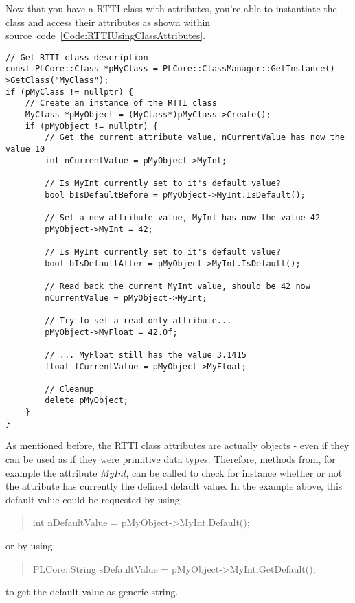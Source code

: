 Now that you have a \ac{RTTI} class with attributes, you're able to instantiate the class and access their attributes as shown within source~code~\ref{Code:RTTIUsingClassAttributes}.
\begin{lstlisting}[label=Code:RTTIUsingClassAttributes,caption={Using \ac{RTTI} class attributes}]
// Get RTTI class description
const PLCore::Class *pMyClass = PLCore::ClassManager::GetInstance()->GetClass("MyClass");
if (pMyClass != nullptr) {
	// Create an instance of the RTTI class
	MyClass *pMyObject = (MyClass*)pMyClass->Create();
	if (pMyObject != nullptr) {
		// Get the current attribute value, nCurrentValue has now the value 10
		int nCurrentValue = pMyObject->MyInt;

		// Is MyInt currently set to it's default value?
		bool bIsDefaultBefore = pMyObject->MyInt.IsDefault();

		// Set a new attribute value, MyInt has now the value 42
		pMyObject->MyInt = 42;

		// Is MyInt currently set to it's default value?
		bool bIsDefaultAfter = pMyObject->MyInt.IsDefault();

		// Read back the current MyInt value, should be 42 now
		nCurrentValue = pMyObject->MyInt;

		// Try to set a read-only attribute...
		pMyObject->MyFloat = 42.0f;

		// ... MyFloat still has the value 3.1415
		float fCurrentValue = pMyObject->MyFloat;

		// Cleanup
		delete pMyObject;
	}
}
\end{lstlisting}
As mentioned before, the \ac{RTTI} class attributes are actually objects - even if they can be used as if they were primitive data types. Therefore, methods from, for example the attribute \emph{MyInt}, can be called to check for instance whether or not the attribute has currently the defined default value. In the example above, this default value could be requested by using \begin{quote}int nDefaultValue = pMyObject->MyInt.Default();\end{quote} or by using \begin{quote}PLCore::String sDefaultValue = pMyObject->MyInt.GetDefault();\end{quote} to get the default value as generic string.

